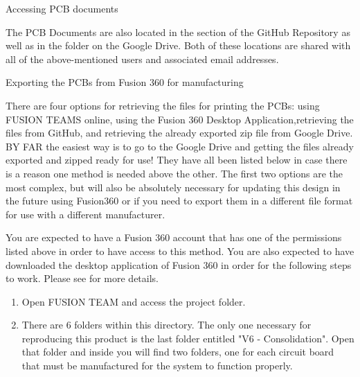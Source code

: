 \begin{subsubsec}{Accessing PCB documents}
\vspace{2em}

The PCB Documents are also located in the  section of the GitHub Repository as well as in the  folder on the Google Drive. Both of these locations are shared with all of the above-mentioned users and associated email addresses. 
\vspace{1em}

\end{subsubsec}





\begin{subsubsec}{Exporting the PCBs from Fusion 360 for manufacturing}

There are four options for retrieving the files for printing the PCBs: using FUSION TEAMS online, using the Fusion 360 Desktop Application,retrieving the files from GitHub, and retrieving the already exported zip file from Google Drive. BY FAR the easiest way is to go to the Google Drive and getting the files already exported and zipped ready for use! They have all been listed below in case there is a reason one method is needed above the other. The first two options are the most complex, but will also be absolutely necessary for updating this design in the future using Fusion360 or if you need to export them in a different file format for use with a different manufacturer. \\
\vspace{1em}



You are expected to have a Fusion 360 account that has one of the permissions listed above in order to have access to this method. You are also expected to have downloaded the desktop application of Fusion 360 in order for the following steps to work. Please see  for more details. 

\begin{enumerate}   %
    \item Open FUSION TEAM and access the project folder.
    \item There are 6 folders within this directory. The only one necessary for reproducing this product is the last folder entitled "V6 - Consolidation". Open that folder and inside you will find two folders, one for each circuit board that must be manufactured for the system to function properly. \\
    

\end{enumerate}
\end{subsubsec}
